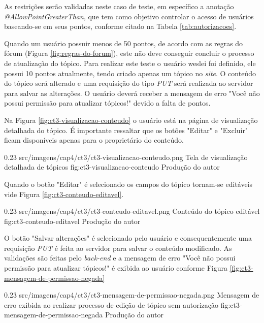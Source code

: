 \par As restrições serão validadas neste caso de teste, em específico a anotação \textit{@AllowPointGreaterThan}, que tem como objetivo controlar o acesso de usuários baseando-se em seus pontos, conforme citado na Tabela \ref{tab:autorizacoes}.
\par Quando um usuário possuir menos de 50 pontos, de acordo com as regras do fórum (Figura \ref{fig:regras-do-forum}), este não deve conseguir concluir o processo de atualização do tópico. Para realizar este teste o usuário weslei foi definido, ele possui 10 pontos atualmente, tendo criado apenas um tópico no \textit{site}. O conteúdo do tópico será alterado e uma requisição do tipo \textit{PUT} será realizada ao servidor para salvar as alterações. O usuário deverá receber a mensagem de erro "Você não possui permissão para atualizar tópicos!" devido a falta de pontos.

\par Na Figura \ref{fig:ct3-visualizacao-conteudo} o usuário está na página de visualização detalhada do tópico. É importante ressaltar que os botões "Editar" e "Excluir" ficam disponíveis apenas para o proprietário do conteúdo. 

\begin{image}
{0.23}
{src/imagens/cap4/ct3/ct3-visualizacao-conteudo.png}
{Tela de visualização detalhada de tópicos}
{fig:ct3-visualizacao-conteudo}
{Produção do autor}
\end{image}

\par Quando o botão "Editar" é selecionado os campos do tópico tornam-se editáveis vide Figura \ref{fig:ct3-conteudo-editavel}.

\begin{image}
{0.23}
{src/imagens/cap4/ct3/ct3-conteudo-editavel.png}
{Conteúdo do tópico editável}
{fig:ct3-conteudo-editavel}
{Produção do autor}
\end{image}

\par O botão "Salvar alterações" é selecionado pelo usuário e consequentemente uma requisição \textit{PUT} é feita ao servidor para salvar o conteúdo modificado. As validações são feitas pelo \textit{back-end} e a mensagem de erro "Você não possui permissão para atualizar tópicos!" é exibida ao usuário conforme Figura \ref{fig:ct3-mensagem-de-permissao-negada}

\begin{image}
{0.23}
{src/imagens/cap4/ct3/ct3-mensagem-de-permissao-negada.png}
{Mensagem de erro exibida ao realizar processo de edição de tópico sem autorização}
{fig:ct3-mensagem-de-permissao-negada}
{Produção do autor}
\end{image}

